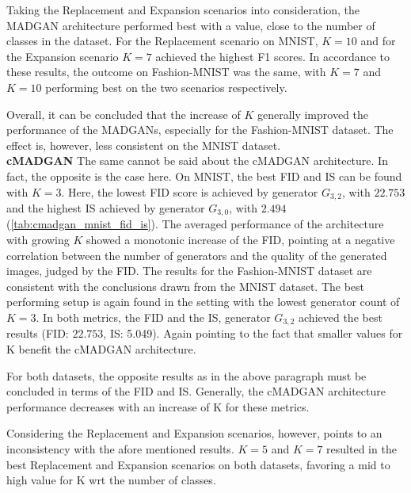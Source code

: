 Taking the Replacement and Expansion scenarios into consideration, the MADGAN architecture performed best with a value, close to the number of classes in the dataset. For the Replacement scenario on MNIST, $K=10$ and for the Expansion scenario $K=7$ achieved the highest F1 scores. In accordance to these results, the outcome on Fashion-MNIST was the same, with $K=7$ and $K=10$ performing best on the two scenarios respectively.

Overall, it can be concluded that the increase of $K$ generally improved the performance of the MADGANs, especially for the Fashion-MNIST dataset. The effect is, however, less consistent on the MNIST dataset. \\

\noindent\textbf{cMADGAN}
The same cannot be said about the cMADGAN architecture. In fact, the opposite is the case here. On MNIST, the best FID and IS can be found with $K=3$. Here, the lowest FID score is achieved by generator \(G_{3,2}\), with $22.753$ and the highest IS achieved by generator \(G_{3,0}\), with $2.494$ (\ref{tab:cmadgan_mnist_fid_is}). The averaged performance of the architecture with growing $K$ showed a monotonic increase of the FID, pointing at a negative correlation between the number of generators and the quality of the generated images, judged by the FID.
The results for the Fashion-MNIST dataset are consistent with the conclusions drawn from the MNIST dataset. The best performing setup is again found in the setting with the lowest generator count of $K=3$. In both metrics, the FID and the IS, generator \(G_{3,2}\) achieved the best results (FID: $22.753$, IS: 5.049). Again pointing to the fact that smaller values for K benefit the cMADGAN architecture.

For both datasets, the opposite results as in the above paragraph must be concluded in terms of the FID and IS. Generally, the cMADGAN architecture performance decreases with an increase of K for these metrics.

Considering the Replacement and Expansion scenarios, however, points to an inconsistency with the afore mentioned results. $K=5$ and $K=7$ resulted in the best Replacement and Expansion scenarios on both datasets, favoring a mid to high value for K wrt the number of classes.


\newpage
